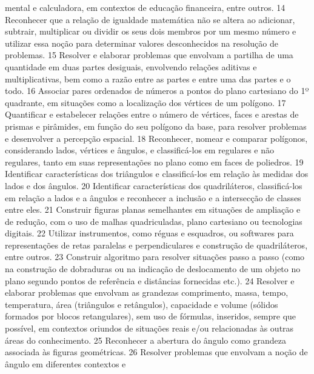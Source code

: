 {{{				mental e calculadora, em contextos de educação financeira, entre outros.
			}
			{14}{%
				Reconhecer que a relação de igualdade matemática não se altera ao adicionar,
				subtrair, multiplicar ou dividir os seus dois membros por um mesmo número e utilizar essa
				noção para determinar valores desconhecidos na resolução de problemas.
			}
			{15}{%
				Resolver e elaborar problemas que envolvam a partilha de uma quantidade em
				duas partes desiguais, envolvendo relações aditivas e multiplicativas, bem como a razão entre
				as partes e entre uma das partes e o todo.
			}
			{16}{%
				Associar pares ordenados de números a pontos do plano cartesiano do 1º
				quadrante, em situações como a localização dos vértices de um polígono.
			}
			{17}{%
				Quantificar e estabelecer relações entre o número de vértices, faces e arestas
				de prismas e pirâmides, em função do seu polígono da base, para resolver problemas e
				desenvolver a percepção espacial.
			}
			{18}{%
				Reconhecer, nomear e comparar polígonos, considerando lados, vértices e
				ângulos, e classificá-los em regulares e não regulares, tanto em suas representações no plano
				como em faces de poliedros.
			}
			{19}{%
				Identificar características dos triângulos e classificá-los em relação às medidas dos
				lados e dos ângulos.
			}
			{20}{%
				Identificar características dos quadriláteros, classificá-los em relação a lados e a
				ângulos e reconhecer a inclusão e a intersecção de classes entre eles.
			}
			{21}{%
				Construir figuras planas semelhantes em situações de ampliação e de redução,
				com o uso de malhas quadriculadas, plano cartesiano ou tecnologias digitais.
			}
			{22}{%
				Utilizar instrumentos, como réguas e esquadros, ou softwares para representações
				de retas paralelas e perpendiculares e construção de quadriláteros, entre outros.
			}
			{23}{%
				Construir algoritmo para resolver situações passo a passo (como na construção
				de dobraduras ou na indicação de deslocamento de um objeto no plano segundo pontos de
				referência e distâncias fornecidas etc.).
			}
			{24}{%
				Resolver e elaborar problemas que envolvam as grandezas comprimento, massa,
				tempo, temperatura, área (triângulos e retângulos), capacidade e volume (sólidos formados
				por blocos retangulares), sem uso de fórmulas, inseridos, sempre que possível, em contextos
				oriundos de situações reais e/ou relacionadas às outras áreas do conhecimento.
			}
			{25}{%
				Reconhecer a abertura do ângulo como grandeza associada às figuras geométricas.
			}
			{26}{%
				Resolver problemas que envolvam a noção de ângulo em diferentes contextos e
}}}
